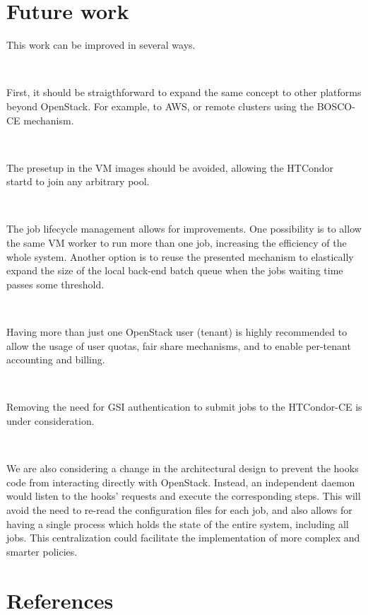 \documentclass[a4paper]{jpconf}
\begin{document}
\section{Future work}

This work can be improved in several ways. 

~

First, it should be straigthforward to expand the same concept to other
platforms beyond OpenStack. For example, to AWS, 
or remote clusters using the BOSCO-CE mechanism.

~

The presetup in the VM images should be avoided, allowing the HTCondor startd to join any arbitrary pool.

~

The job lifecycle management allows for improvements. 
One possibility is to allow the same VM worker to run more than one job,
increasing the efficiency of the whole system. Another option is to reuse the
presented mechanism to elastically expand the size of the local back-end batch
queue when the jobs waiting time passes some threshold.

~

Having more than just one OpenStack user (tenant) is highly recommended to allow
the usage of user quotas, fair share mechanisms, and to enable per-tenant
accounting and billing.

~

Removing the need for GSI authentication to submit jobs to the HTCondor-CE is under consideration.

~

We are also considering a change in the architectural design to prevent the
hooks code from interacting directly with OpenStack. Instead, an independent
daemon would listen to the hooks' requests and execute the corresponding steps.
This will avoid the need to re-read the configuration files for each job, 
and also allows for having a single process which holds the state of the entire
system, including all jobs. This centralization could facilitate the
implementation of more complex and smarter policies.
 




\section*{References}{}
\end{document}
